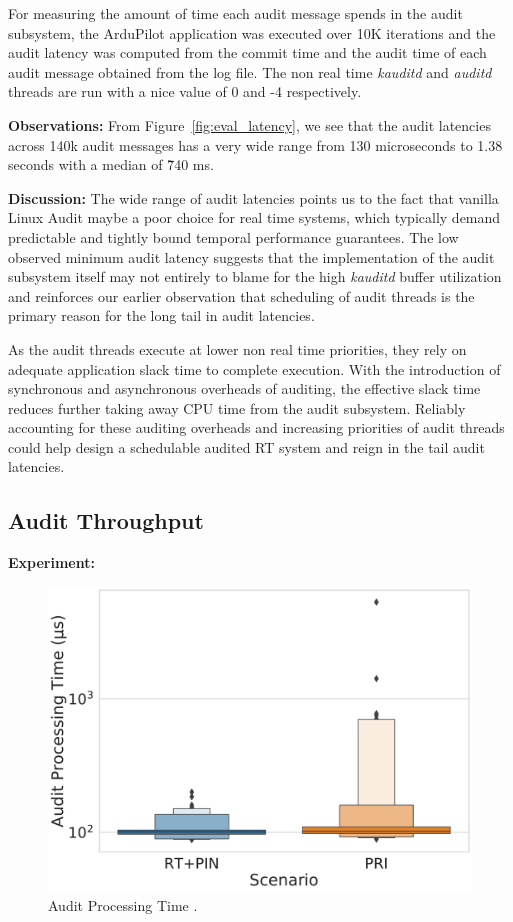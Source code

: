 For measuring the amount of time each audit message spends in the audit subsystem, the ArduPilot application was executed over 10K iterations and the audit latency was computed from the commit time and the audit time of each audit message obtained from the log file. The non real time \textit{kauditd} and \textit{auditd} threads are run with a nice value of 0 and -4 respectively.

\textbf{Observations:} From Figure~\ref{fig:eval_latency}, we see that the audit latencies across 140k audit messages has a very wide range from 130 microseconds to 1.38 seconds with a median of \~740 ms. 

\textbf{Discussion:} 
The wide range of audit latencies points us to the fact that vanilla Linux Audit maybe a poor choice for real time systems, which typically demand predictable and tightly bound temporal performance guarantees. The low observed minimum audit latency suggests that the implementation of the audit subsystem itself may not entirely to blame for the high \textit{kauditd} buffer utilization and reinforces our earlier observation that scheduling of audit threads is the primary reason for the long tail in audit latencies.

As the audit threads execute at lower non real time priorities, they rely on adequate application slack time to complete execution. With the introduction of synchronous and asynchronous overheads of auditing, the effective slack time reduces further taking away CPU time from the audit subsystem. Reliably accounting for these auditing overheads and increasing priorities of audit threads could help design a schedulable audited RT system and reign in the tail audit latencies.

\subsection{Audit Throughput}
\textbf{Experiment:}
\begin{figure}[tbp]
    \centering
    \includegraphics[width=0.9\linewidth,keepaspectratio,scale=0.9]{fig/Throughput_cdf.pdf}
    \caption{\label{fig:eval_throughput}Audit Processing Time .}
\end{figure}

